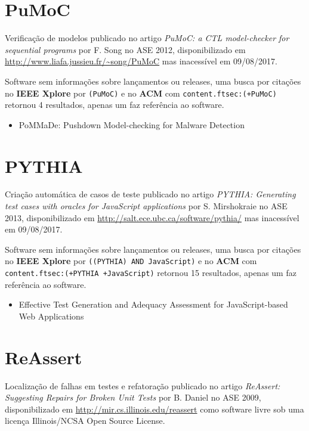 \section{PuMoC}

Verificação de modelos
publicado no artigo {\it PuMoC: a CTL model-checker for sequential programs}
por F. Song
no ASE 2012,
disponibilizado em \url{http://www.liafa.jussieu.fr/~song/PuMoC}
mas inacessível em 09/08/2017.

Software sem informações sobre lançamentos ou releases,
uma busca por citações no {\bf IEEE Xplore} por
\texttt{(PuMoC)}
e no {\bf ACM} com
\texttt{content.ftsec:(+PuMoC)}
retornou
4 resultados,
apenas um faz referência ao software.

\begin{itemize}
\item PoMMaDe: Pushdown Model-checking for Malware Detection
\end{itemize}


\section{PYTHIA}

Criação automática de casos de teste
publicado no artigo {\it PYTHIA: Generating test cases with oracles for JavaScript applications}
por S. Mirshokraie
no ASE 2013,
disponibilizado em \url{http://salt.ece.ubc.ca/software/pythia/}
mas inacessível em 09/08/2017.

Software sem informações sobre lançamentos ou releases,
uma busca por citações no {\bf IEEE Xplore} por
\texttt{((PYTHIA) AND JavaScript)}
e no {\bf ACM} com
\texttt{content.ftsec:(+PYTHIA +JavaScript)}
retornou
15 resultados,
apenas um faz referência ao software.

\begin{itemize}
\item Effective Test Generation and Adequacy Assessment for JavaScript-based Web Applications
\end{itemize}


\section{ReAssert}

Localização de falhas em testes e refatoração
publicado no artigo {\it ReAssert: Suggesting Repairs for Broken Unit Tests}
por B. Daniel
no ASE 2009,
disponibilizado em \url{http://mir.cs.illinois.edu/reassert}
como software livre
sob uma licença Illinois/NCSA Open Source License.

